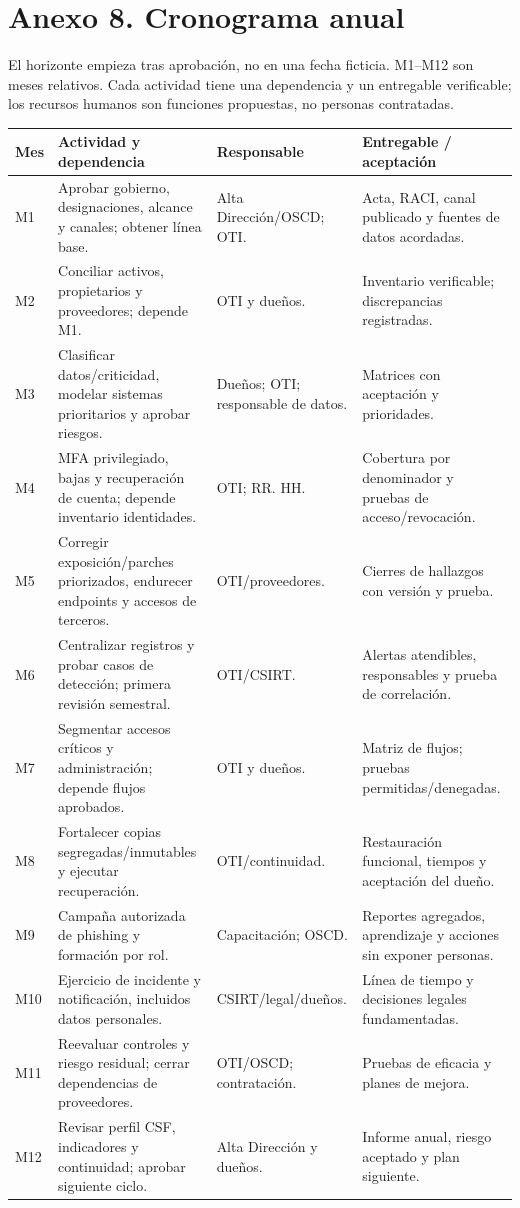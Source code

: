 \documentclass[10pt,a4paper]{article}
\newcommand{\anexo}[2]{\clearpage\section*{Anexo #1. #2}\addcontentsline{toc}{section}{Anexo #1. #2}}
\newcommand{\cabecera}[1]{\textbf{#1}}
\begin{document}
\anexo{8}{Cronograma anual}
El horizonte empieza tras aprobación, no en una fecha ficticia. M1--M12 son meses relativos. Cada actividad tiene una dependencia y un entregable verificable; los recursos humanos son funciones propuestas, no personas contratadas.
\begin{TablaCompacta}
\begin{longtable}{P{19mm}P{61mm}P{35mm}P{44mm}}
\toprule\cabecera{Mes} & \cabecera{Actividad y dependencia} & \cabecera{Responsable} & \cabecera{Entregable / aceptación}\\\midrule\endhead
M1 & Aprobar gobierno, designaciones, alcance y canales; obtener línea base. & Alta Dirección/OSCD; OTI. & Acta, RACI, canal publicado y fuentes de datos acordadas.\\
M2 & Conciliar activos, propietarios y proveedores; depende M1. & OTI y dueños. & Inventario verificable; discrepancias registradas.\\
M3 & Clasificar datos/criticidad, modelar sistemas prioritarios y aprobar riesgos. & Dueños; OTI; responsable de datos. & Matrices con aceptación y prioridades.\\
M4 & MFA privilegiado, bajas y recuperación de cuenta; depende inventario identidades. & OTI; RR. HH. & Cobertura por denominador y pruebas de acceso/revocación.\\
M5 & Corregir exposición/parches priorizados, endurecer endpoints y accesos de terceros. & OTI/proveedores. & Cierres de hallazgos con versión y prueba.\\
M6 & Centralizar registros y probar casos de detección; primera revisión semestral. & OTI/CSIRT. & Alertas atendibles, responsables y prueba de correlación.\\
M7 & Segmentar accesos críticos y administración; depende flujos aprobados. & OTI y dueños. & Matriz de flujos; pruebas permitidas/denegadas.\\
M8 & Fortalecer copias segregadas/inmutables y ejecutar recuperación. & OTI/continuidad. & Restauración funcional, tiempos y aceptación del dueño.\\
M9 & Campaña autorizada de phishing y formación por rol. & Capacitación; OSCD. & Reportes agregados, aprendizaje y acciones sin exponer personas.\\
M10 & Ejercicio de incidente y notificación, incluidos datos personales. & CSIRT/legal/dueños. & Línea de tiempo y decisiones legales fundamentadas.\\
M11 & Reevaluar controles y riesgo residual; cerrar dependencias de proveedores. & OTI/OSCD; contratación. & Pruebas de eficacia y planes de mejora.\\
M12 & Revisar perfil CSF, indicadores y continuidad; aprobar siguiente ciclo. & Alta Dirección y dueños. & Informe anual, riesgo aceptado y plan siguiente.\\\bottomrule
\end{longtable}
\end{TablaCompacta}
\end{document}
